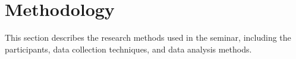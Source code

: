 \chapter{Methodology}%

This section describes the research methods used in the seminar, including the
participants, data collection techniques, and data analysis methods.